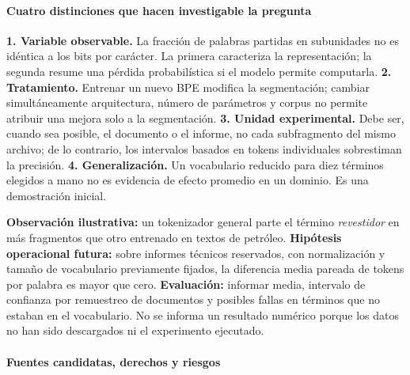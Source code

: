 \paragraph{Cuatro distinciones que hacen investigable la pregunta}

\textbf{1. Variable observable.} La fracción de palabras partidas en subunidades
no es idéntica a los bits por carácter. La primera caracteriza la representación;
la segunda resume una pérdida probabilística si el modelo permite computarla.
\textbf{2. Tratamiento.} Entrenar un nuevo BPE modifica la segmentación; cambiar
simultáneamente arquitectura, número de parámetros y corpus no permite atribuir
una mejora solo a la segmentación.
\textbf{3. Unidad experimental.} Debe ser, cuando sea posible, el documento o
el informe, no cada subfragmento del mismo archivo; de lo contrario,
los intervalos basados en tokens individuales sobrestiman la precisión.
\textbf{4. Generalización.} Un vocabulario reducido para diez términos elegidos a mano
no es evidencia de efecto promedio en un dominio. Es una demostración inicial.

\begin{ejemplo}
\textbf{Observación ilustrativa:} un tokenizador general parte el término
\emph{revestidor} en más fragmentos que otro entrenado en textos de petróleo.
\textbf{Hipótesis operacional futura:} sobre informes técnicos reservados,
con normalización y tamaño de vocabulario previamente fijados,
la diferencia media pareada de tokens por palabra es mayor que cero.
\textbf{Evaluación:} informar media, intervalo de confianza por remuestreo de
documentos y posibles fallas en términos que no estaban en el vocabulario.
No se informa un resultado numérico porque los datos no han sido descargados
ni el experimento ejecutado.
\end{ejemplo}

\paragraph{Fuentes candidatas, derechos y riesgos}


